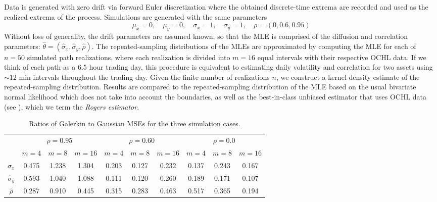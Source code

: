 Data is generated with zero drift via forward Euler discretization
where the obtained discrete-time extrema are recorded and used as the
realized extrema of the process. Simulations are generated with the same
parameters
\[
  \mu_x = 0,\quad \mu_y  = 0,\quad \sigma_x = 1,\quad \sigma_y = 1,\quad \rho = (0, 0.6, 0.95)
\]
Without loss of generality, the drift parameters are assumed known, so
that the MLE is comprised of the diffusion and correlation parameters:
$\hat{\theta} = (\hat{\sigma}_x, \hat{\sigma}_y, \hat{\rho}).$ The
repeated-sampling distributions of the MLEs are approximated by
computing the MLE for each of $n=50$ simulated path realizations,
where each realization is divided into $m=16$ equal intervals with
their respective OCHL data. If we think of each path as a 6.5 hour
trading day, this procedure is equivalent to estimating daily
volatility and correlation for two assets using $\sim 12$ min intervals
throughout the trading day.  Given the finite number of realizations
$n$, we construct a kernel density estimate of the repeated-sampling
distribution. Results are compared to the repeated-sampling
distribution of the MLE based on the usual bivariate normal likelihood
which does not take into account the boundaries, as well as the
best-in-class unbiased estimator that uses OCHL data (see
\cite{rogers2008estimating}), which we term the \textit{Rogers
  estimator}.


\begin{table}
  \centering
  \begin{tabular}{cccc|ccc|ccc}
    &  \multicolumn{3}{c}{$\rho=0.95$} & \multicolumn{3}{c}{$\rho=0.60$} &  \multicolumn{3}{c}{$\rho=0.0$}\\
    & $m=4$ & $m=8$ & $m=16$ & $m=4$ & $m=8$ & $m=16$ & $m=4$ & $m=8$ & $m=16$ \\
    \hline
    $\hat{\sigma}_x$ & 0.475 & 1.238 & 1.304 & 0.203 & 0.127 & 0.232 & 0.137 & 0.243 & 0.167 \\
    \hline
    $\hat{\sigma}_y$ & 0.593 & 1.040 & 1.088 &  0.111 & 0.120 & 0.260 & 0.189 & 0.171 & 0.107 \\
    \hline
    $\hat{\rho}$ & 0.287 & 0.910 & 0.445 & 0.315 & 0.283 & 0.463 & 0.517 & 0.365 & 0.194
  \end{tabular}
  \caption{Ratios of Galerkin to Gaussian MSEs for the three simulation cases.}
  \label{tab:MSE-ratios}
\end{table}

